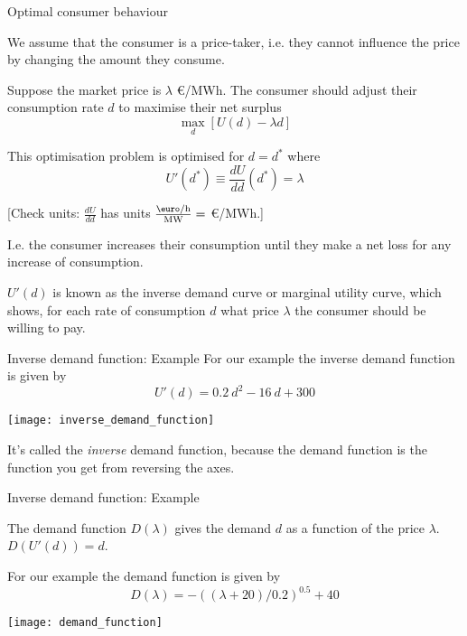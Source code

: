 \documentclass[10pt,aspectratio=169,dvipsnames]{beamer}
\def\l{\lambda}
\begin{document}
\begin{frame}{Optimal consumer behaviour}



  We assume that the consumer is a \alert{price-taker},
  i.e. they cannot influence the price by changing the amount they
  consume.

  Suppose the market price is $\lambda$ \euro/MWh. The consumer should
  adjust their consumption rate $d$ to maximise their \alert{net surplus}
  \begin{equation*}
    \max_d \left[U(d) - \l d \right]
  \end{equation*}

  This optimisation problem is optimised for $d=d^*$ where
  \begin{equation*}
    U'(d^*) \equiv \frac{dU}{dd} (d^*) =  \l
  \end{equation*}

  [Check units: $\frac{dU}{dd}$ has units $\frac{\textrm{\euro/h}}{\textrm{MW}} = $ \euro/MWh.]

  I.e. the consumer increases their consumption until they make a net loss for any increase of consumption.

  $U'(d)$ is known as the \alert{inverse demand curve} or \alert{marginal utility curve}, which shows,
  for each rate of consumption $d$ what price $\l$ the consumer should be
  willing to pay.


\end{frame}



\begin{frame}{Inverse demand function: Example}
  For our example the inverse demand function is given by
  \begin{equation*}
    U'(d) = 0.2~d^2 - 16~d + 300
  \end{equation*}

  \centering
  \texttt{[image: inverse\_demand\_function]}

  \raggedright
  It's called the \emph{inverse} demand function, because the demand function is the function you get from reversing the axes.
\end{frame}


\begin{frame}{Inverse demand function: Example}


  The \alert{demand function} $D(\l)$ gives the demand $d$ as a function of the price $\l$. $D(U'(d)) = d$.

  For our example the demand function is given by
  \begin{equation*}
    D(\l) =  -((\l+20 )/0.2)^{0.5} +40
  \end{equation*}

  \centering
  \texttt{[image: demand\_function]}

\end{frame}
\end{document}
